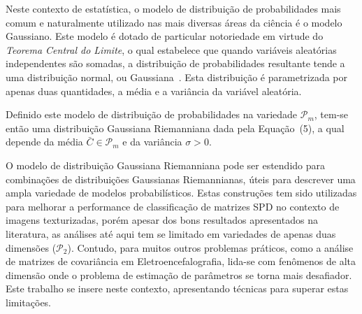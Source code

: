 \documentclass[a4paper,titlepage]{article}
\begin{document}
Neste contexto de estatística, o modelo de distribuição de probabilidades
mais comum e naturalmente utilizado nas mais diversas áreas da ciência é o
modelo Gaussiano. Este modelo é dotado de particular notoriedade em virtude do
\textit{Teorema Central do Limite}, o qual estabelece que quando variáveis
aleatórias independentes são somadas, a distribuição de probabilidades
resultante tende a uma distribuição normal, ou
Gaussiana~\cite{fischer2010history}. Esta distribuição é parametrizada por
apenas duas quantidades, a média e a variância da variável aleatória.

Definido este modelo de distribuição de probabilidades na variedade
$\mathcal{P}_m$, tem-se então uma distribuição Gaussiana Riemanniana dada pela
Equação~(5), a qual depende da média $\bar{C} \in \mathcal{P}_m$ e da variância
$\sigma > 0$.

\begin{center}
  \vspace{1em}
  \vspace{1em}
\end{center}

O modelo de distribuição Gaussiana Riemanniana pode ser estendido para
combinações de distribuições Gaussianas Riemannianas, úteis para descrever uma
ampla variedade de modelos probabilísticos. Estas construções tem sido
utilizadas para melhorar a performance de classificação de matrizes SPD no
contexto de imagens texturizadas, porém apesar dos bons resultados apresentados
na literatura, as análises até aqui tem se limitado em variedades de apenas
duas dimensões ($\mathcal{P}_2$). Contudo, para muitos outros problemas
práticos, como a análise de matrizes de covariância em Eletroencefalografia,
lida-se com fenômenos de alta dimensão onde o problema de estimação de
parâmetros se torna mais desafiador. Este trabalho se insere neste contexto,
apresentando técnicas para superar estas limitações.  
\end{document}
